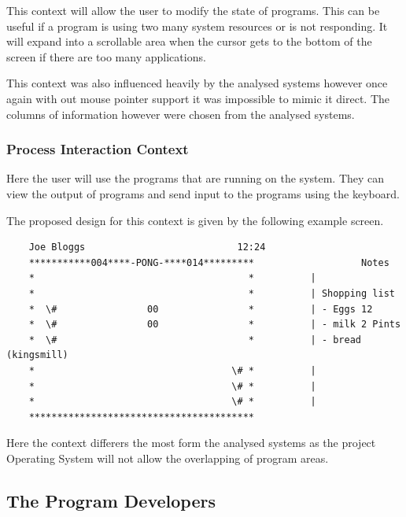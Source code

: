\documentclass[a4paper]{report}
\begin{document}
This context will allow the user to modify the state of programs. This can be useful if a program is using two many system resources or is not responding. It will expand into a scrollable area when the cursor gets to the bottom of the screen if there are too many applications.

This context was also influenced heavily by the analysed systems however once again with out mouse pointer support it was impossible to mimic it direct. The columns of information however were chosen from the analysed systems.

\subsubsection*{Process Interaction Context}

Here the user will use the programs that are running on the system. They can view the output of programs and send input to the programs using the keyboard.

The proposed design for this context is given by the following example screen.

{\ttfamily \small
  \begin{framed}
    \begin{verbatim}
    Joe Bloggs                           12:24
    ***********004****-PONG-****014*********                   Notes
    *                                      *          |
    *                                      *          | Shopping list
    *  \#                00                *          | - Eggs 12
    *  \#                00                *          | - milk 2 Pints
    *  \#                                  *          | - bread (kingsmill)
    *                                   \# *          |
    *                                   \# *          |
    *                                   \# *          |
    ****************************************
    \end{verbatim}
  \end{framed}
}

Here the context differers the most form the analysed systems as the project Operating System will not allow the overlapping of program areas.



\subsection*{The Program Developers}
\end{document}
